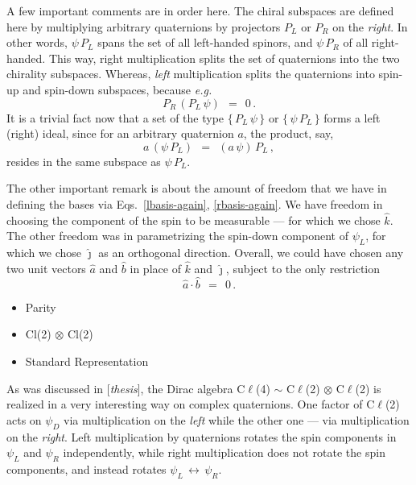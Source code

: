 \documentclass[epsfig,12pt]{article}
\newcommand{\jj}{\hat\jmath}
\newcommand{\kk}{\hat k}
\begin{document}
	A few important comments are in order here.
	The chiral subspaces are defined here by multiplying
	arbitrary quaternions by projectors $ P_L $ or $ P_R $ on the \emph{right}.
	In other words, $ \psi\, P_L $ spans the set of all left-handed spinors,
	and $ \psi\, P_R $ of all right-handed.
	This way, right multiplication splits the set of quaternions into
	the two chirality subspaces.
	Whereas, \emph{left} multiplication splits the quaternions into
	spin-up and spin-down subspaces, because \emph{e.g.}
\[
	P_R\, (P_L\, \psi)	~~=~~	0\,.
\]
	It is a trivial fact now that a set of the type $ \big\{\, P_L\, \psi \,\} $ or $ \big\{\, \psi\, P_L \,\} $
	forms a left (right) ideal, since for an arbitrary quaternion $ a $,
	the product, say,
\[
	a\, (\psi\, P_L)	~~=~~	(a\, \psi)\, P_L\,,
\]
	resides in the same subspace as $ \psi\, P_L $.

	The other important remark is about the amount of freedom that we have in defining
	the bases via Eqs.~\eqref{lbasis-again}, \eqref{rbasis-again}.
	We have freedom in choosing the component of the spin to be measurable --- for which we chose $ \kk $.
	The other freedom was in parametrizing the spin-down component of $ \psi_L $,
	for which we chose $ \jj $ as an orthogonal direction.
	Overall, we could have chosen any two unit vectors $ \hat a $ and $ \hat b $ in place of $ \kk $
	and $ \jj $, subject to the only restriction
\[
	\hat a \cdot \hat b	~~=~~	0\,.
\]

\begin{itemize}

\item	Parity

\item	Cl(2) $ \otimes $ Cl(2)

\item	Standard Representation

\end{itemize}

	As was discussed in [\emph{thesis}], the Dirac algebra
	C$\ell$(4) $ \sim $  C$\ell$(2) $ \otimes $ C$\ell$(2)
	is realized in a very interesting way on complex quaternions.
	One factor of C$\ell$(2) acts on $ \psi_D $ via multiplication on the \emph{left}
	while the other one --- via multiplication on the \emph{right}.
	Left multiplication by quaternions rotates the spin components in 
	$ \psi_L $ and $ \psi_R $ independently, while right multiplication
	does not rotate the spin components, and instead rotates 
	$ \psi_L \,\leftrightarrow\, \psi_R $.
\end{document}
